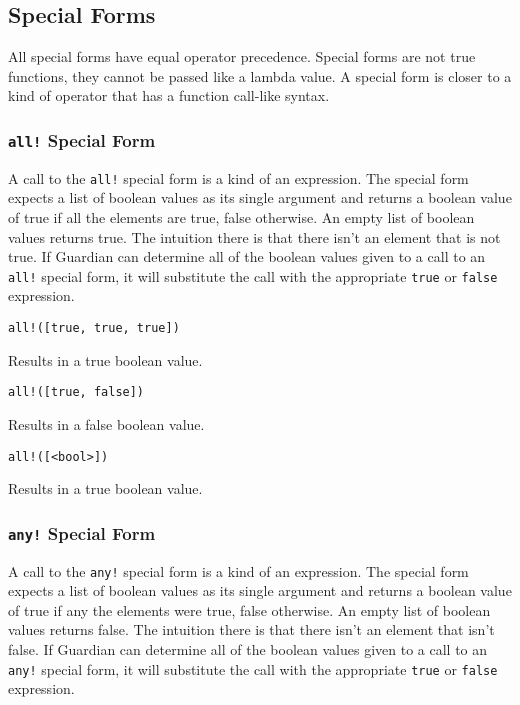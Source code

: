 
\subsection{Special Forms}
{
	All special forms have equal operator precedence.
	Special forms are not true functions, they
	cannot be passed like a lambda
	value. A special form is closer to a kind of operator
	that has a function call-like
	syntax.
	
	\subsubsection{\texttt{all!} Special Form}
	{
		A call to the \texttt{all!} special form is a kind of an expression.
		The special form expects a list of boolean values as its
		single argument and returns a boolean value of true if all the elements
		are true, false otherwise. An empty list of boolean values returns true.
		The intuition there is that there isn't an element that is not true.
		If Guardian can determine all of the boolean values given to a call to an
		\texttt{all!} special form, it will substitute the call with the
		appropriate \texttt{true} or \texttt{false} expression.
		
		\begin{itemize}
		{
			\item[] \texttt{all!([true, true, true])}
			
				Results in a true boolean value.
			
			\item[] \texttt{all!([true, false])}
			
				Results in a false boolean value.
			
			\item[] \texttt{all!([<bool>])}
			
				Results in a true boolean value.
		}
		\end{itemize}
	}
	
	\subsubsection{\texttt{any!} Special Form}
	{
		A call to the \texttt{any!} special form is a kind of an expression.
		The special form expects a list of boolean values as its
		single argument and returns a boolean value of true if any the elements
		were true, false otherwise. An empty list of boolean values returns false.
		The intuition there is that there isn't an element that isn't false.
		If Guardian can determine all of the boolean values given to a call to an
		\texttt{any!} special form, it will substitute the call with the
		appropriate \texttt{true} or \texttt{false} expression.
		
}}
